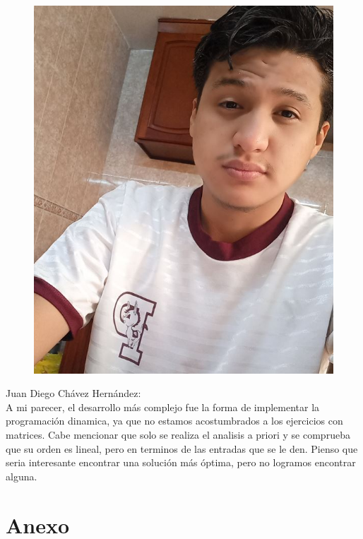 \documentclass{article}
\begin{document}
    \begin{figure}
        \centering
        \includegraphics[scale=0.2]{diego.jpg}
    \end{figure}
    Juan Diego Chávez Hernández:\\
    A mi parecer, el desarrollo más complejo fue la forma de implementar la programación dinamica, ya que no estamos acostumbrados a los ejercicios con matrices.  Cabe mencionar que solo se realiza el analisis a priori y se comprueba que su orden es lineal, pero en terminos de las entradas que se le den. Pienso que seria interesante encontrar una solución más óptima, pero no logramos encontrar alguna.\\
    \newpage
    \newpage
\section{Anexo}
\end{document}
